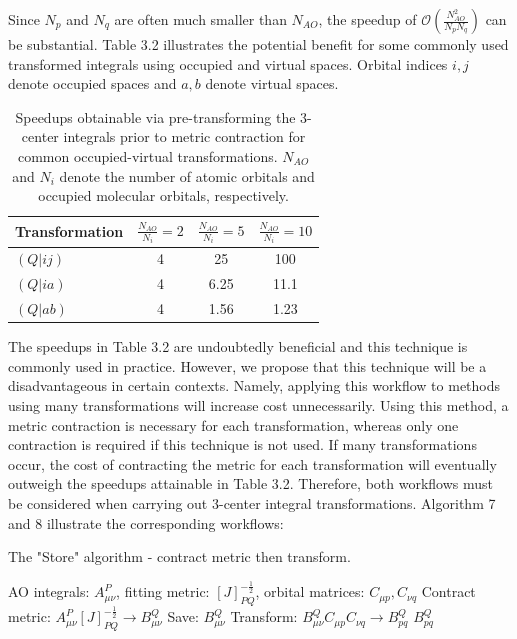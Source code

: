 \noindent Since $N_p$ and $N_q$ are often much smaller than $N_{AO}$, the speedup of 
$\mathcal{O}(\frac{N_{AO}^2}{N_pN_q})$ can be substantial. 
Table 3.2 illustrates the potential benefit for some commonly used transformed integrals using occupied and virtual spaces.
Orbital indices $i,j$ denote occupied spaces and $a,b$ denote virtual spaces.

\begingroup
\begin{table}[H]
\centering
\renewcommand{\baselinestretch}{1}
\caption{Speedups obtainable via pre-transforming the 3-center integrals prior to metric contraction for common occupied-virtual transformations.
$N_{AO}$ and $N_i$ denote the number of atomic orbitals and occupied molecular orbitals, respectively. }
\begin{tabular}{l c c c}
\multicolumn{1}{l}{\textbf{Transformation}} &
\multicolumn{1}{c}{\textbf{$\frac{N_{AO}}{N_i}=2$}} & 
\multicolumn{1}{c}{\textbf{$\frac{N_{AO}}{N_i}=5$}} & 
\multicolumn{1}{c}{\textbf{$\frac{N_{AO}}{N_i}=10$}} \\ 
\hline
$(Q|ij)$       & 4               & 25              & 100      \\ 
$(Q|ia)$       & 4               & 6.25            & 11.1     \\ 
$(Q|ab)$        & 4              & 1.56            & 1.23     \\
\end{tabular}
\end{table}
\endgroup

The speedups in Table 3.2 are undoubtedly beneficial and this technique is commonly used in practice. 
However, we propose that this technique will be a disadvantageous in certain contexts. 
Namely, applying this workflow to methods using many transformations will increase cost unnecessarily. 
Using this method, a metric contraction is necessary for each transformation, whereas only one contraction is required if this technique is not used.
If many transformations occur, the cost of contracting the metric for 
each transformation will eventually outweigh the speedups attainable in Table 3.2. Therefore, both workflows must be considered when carrying
out 3-center integral transformations. Algorithm 7 and 8 illustrate the corresponding workflows:

\begin{algorithm}[H]
\caption{The "Store" algorithm - contract metric then transform.}
\begin{algorithmic}
\REQUIRE AO integrals: $A_{\mu \nu}^P$, fitting metric: $[J]_{PQ}^{-\frac{1}{2}}$, orbital matrices: $C_{\mu p}, C_{\nu q}$
\STATE Contract metric: $A_{\mu \nu}^P [J]_{PQ}^{-\frac{1}{2}} \rightarrow B_{\mu \nu}^Q$
\STATE Save: $B_{\mu \nu}^Q$
    \STATE Transform: $B_{\mu \nu}^QC_{\mu p}C_{\nu q} \rightarrow B_{p q}^Q$
\ENDFOR
\RETURN $B_{p q}^Q$
\end{algorithmic}
\end{algorithm}

